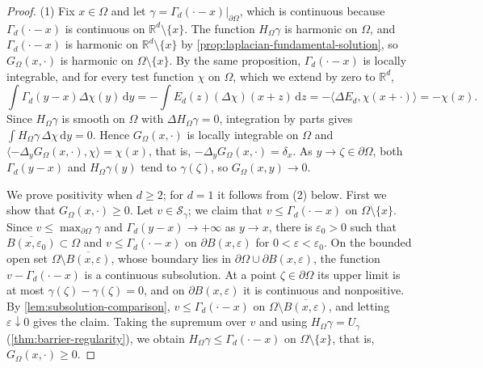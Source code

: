 \begin{proof}
(1) Fix $x\in\Omega$ and let $\gamma=\Gamma_d(\cdot-x)|_{\partial\Omega}$, which is continuous because $\Gamma_d(\cdot-x)$ is continuous on $\mathbb R^d\setminus\{x\}$. The function $H_\Omega\gamma$ is harmonic on $\Omega$, and $\Gamma_d(\cdot-x)$ is harmonic on $\mathbb R^d\setminus\{x\}$ by \cref{prop:laplacian-fundamental-solution}, so $G_\Omega(x,\cdot)$ is harmonic on $\Omega\setminus\{x\}$. By the same proposition, $\Gamma_d(\cdot-x)$ is locally integrable, and for every test function $\chi$ on $\Omega$, which we extend by zero to $\mathbb R^d$,
\[
 \int\Gamma_d(y-x)\Delta\chi(y)\,\mathrm dy=-\int E_d(z)(\Delta\chi)(x+z)\,\mathrm dz=-\langle\Delta E_d,\chi(x+\cdot)\rangle=-\chi(x).
\]
Since $H_\Omega\gamma$ is smooth on $\Omega$ with $\Delta H_\Omega\gamma=0$, integration by parts gives $\int H_\Omega\gamma\,\Delta\chi\,\mathrm dy=0$. Hence $G_\Omega(x,\cdot)$ is locally integrable on $\Omega$ and $\langle-\Delta_yG_\Omega(x,\cdot),\chi\rangle=\chi(x)$, that is, $-\Delta_yG_\Omega(x,\cdot)=\delta_x$. As $y\to\zeta\in\partial\Omega$, both $\Gamma_d(y-x)$ and $H_\Omega\gamma(y)$ tend to $\gamma(\zeta)$, so $G_\Omega(x,y)\to0$.

We prove positivity when $d\geq2$; for $d=1$ it follows from (2) below. First we show that $G_\Omega(x,\cdot)\geq0$. Let $v\in\mathcal S_\gamma$; we claim that $v\leq\Gamma_d(\cdot-x)$ on $\Omega\setminus\{x\}$. Since $v\leq\max_{\partial\Omega}\gamma$ and $\Gamma_d(y-x)\to+\infty$ as $y\to x$, there is $\varepsilon_0>0$ such that $\overline{B(x,\varepsilon_0)}\subset\Omega$ and $v\leq\Gamma_d(\cdot-x)$ on $\partial B(x,\varepsilon)$ for $0<\varepsilon<\varepsilon_0$. On the bounded open set $\Omega\setminus\overline{B(x,\varepsilon)}$, whose boundary lies in $\partial\Omega\cup\partial B(x,\varepsilon)$, the function $v-\Gamma_d(\cdot-x)$ is a continuous subsolution. At a point $\zeta\in\partial\Omega$ its upper limit is at most $\gamma(\zeta)-\gamma(\zeta)=0$, and on $\partial B(x,\varepsilon)$ it is continuous and nonpositive. By \cref{lem:subsolution-comparison}, $v\leq\Gamma_d(\cdot-x)$ on $\Omega\setminus\overline{B(x,\varepsilon)}$, and letting $\varepsilon\downarrow0$ gives the claim. Taking the supremum over $v$ and using $H_\Omega\gamma=U_\gamma$ (\cref{thm:barrier-regularity}), we obtain $H_\Omega\gamma\leq\Gamma_d(\cdot-x)$ on $\Omega\setminus\{x\}$, that is, $G_\Omega(x,\cdot)\geq0$.


\end{proof}
